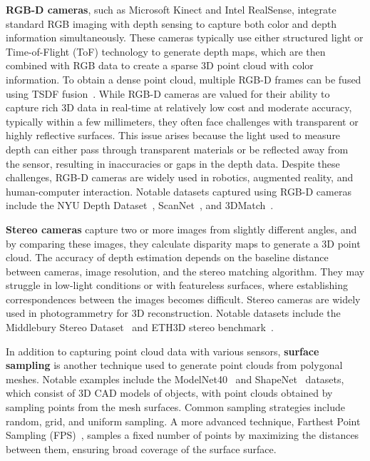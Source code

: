 \textbf{RGB-D cameras}, such as Microsoft Kinect and Intel RealSense, integrate standard RGB imaging with depth sensing to capture both color and depth information simultaneously. These cameras typically use either structured light or Time-of-Flight (ToF) technology to generate depth maps, which are then combined with RGB data to create a sparse 3D point cloud with color information. To obtain a dense point cloud, multiple RGB-D frames can be fused using TSDF fusion~\cite{curless1996volumetric,zeng20163dmatch}. While RGB-D cameras are valued for their ability to capture rich 3D data in real-time at relatively low cost and moderate accuracy, typically within a few millimeters, they often face challenges with transparent or highly reflective surfaces. This issue arises because the light used to measure depth can either pass through transparent materials or be reflected away from the sensor, resulting in inaccuracies or gaps in the depth data. Despite these challenges, RGB-D cameras are widely used in robotics, augmented reality, and human-computer interaction. Notable datasets captured using RGB-D cameras include the NYU Depth Dataset~\cite{Silberman_ECCV12}, ScanNet~\cite{dai2017scannet}, and 3DMatch~\cite{zeng20163dmatch}.

\textbf{Stereo cameras} capture two or more images from slightly different angles, and by comparing these images, they calculate disparity maps to generate a 3D point cloud. The accuracy of depth estimation depends on the baseline distance between cameras, image resolution, and the stereo matching algorithm. They may struggle in low-light conditions or with featureless surfaces, where establishing correspondences between the images becomes difficult. Stereo cameras are widely used in photogrammetry for 3D reconstruction. Notable datasets include the Middlebury Stereo Dataset~\cite{scharstein2002taxonomy} and ETH3D stereo benchmark~\cite{schops2017multi}.

In addition to capturing point cloud data with various sensors, \textbf{surface sampling} is another technique used to generate point clouds from polygonal meshes. Notable examples include the ModelNet40~\cite{wu2015ModelNet} and ShapeNet~\cite{chang2015shapenet} datasets, which consist of 3D CAD models of objects, with point clouds obtained by sampling points from the mesh surfaces. Common sampling strategies include random, grid, and uniform sampling. A more advanced technique, Farthest Point Sampling (FPS)~\cite{qi2017pointnet++}, samples a fixed number of points by maximizing the distances between them, ensuring broad coverage of the surface surface.

